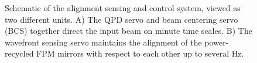 \begin{figure} \begin{centering}  \caption[Schematic of the alignment sensing and control system, viewed as two different units.]{Schematic of the alignment sensing and control system, viewed as two different units. A) The QPD servo and beam centering servo (BCS) together direct the input beam on minute time scales. B) The wavefront sensing servo maintains the alignment of the power-recycled FPM mirrors with respect to each other up to several Hz.}
\label{fig:ASClayout}
\end{centering}
\end{figure}

